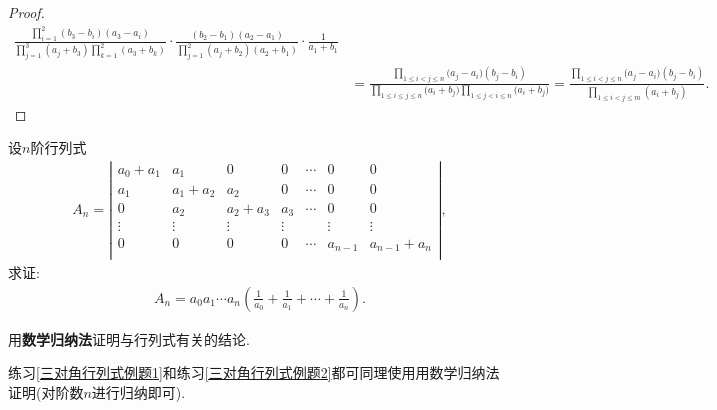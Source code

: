 \documentclass[../../main.tex]{subfiles}
\begin{document}
\begin{proof}
\begin{align*}
\frac{\prod\limits_{i=1}^2{\left( b_3-b_i \right) \left( a_3-a_i \right)}}{\prod\limits_{j=1}^3{\left( a_j+b_3 \right) \prod\limits_{k=1}^2{\left( a_3+b_k \right)}}}\cdot \frac{\left( b_2-b_1 \right) \left( a_2-a_1 \right)}{\prod\limits_{j=1}^2{\left( a_j+b_2 \right) \left( a_2+b_1 \right)}}\cdot \frac{1}{a_1+b_1}
\\
&=\frac{\prod\limits_{1\le i<j\le n}{(a_j}-a_i)(b_j-b_i)}{\prod\limits_{1\le i\le j\le n}{(a_i}+b_j)\prod\limits_{1\le j<i\le n}{(a_i}+b_j)}=\frac{\prod\limits_{1\le i<j\le n}{(a_j}-a_i)(b_j-b_i)}{\prod\limits_{1\leqslant i<j\leqslant m}{\left( a_i+b_j \right)}}.
\nonumber
\end{align*}
\end{proof}

\begin{example}\label{使用数学归纳法计算行列式例题1}
    设$n$阶行列式
    \begin{align}
    A_n=\left| \begin{matrix}
    a_0+a_1&		a_1&		0&		0&		\cdots&		0&		0\\
    a_1&		a_1+a_2&		a_2&		0&		\cdots&		0&		0\\
    0&		a_2&		a_2+a_3&		a_3&		\cdots&		0&		0\\
    \vdots&		\vdots&		\vdots&		\vdots&		&		\vdots&		\vdots\\
    0&		0&		0&		0&		\cdots&		a_{n-1}&		a_{n-1}+a_n\\
    \end{matrix} \right|,
    \nonumber
    \end{align}
    求证:
    \begin{align}
    A_n=a_0a_1\cdots a_n\left( \frac{1}{a_0}+\frac{1}{a_1}+\cdots +\frac{1}{a_n} \right) .
    \nonumber
    \end{align}
    \end{example}
    \begin{note}
    用\hypertarget{用数学归纳法与行列式有关的结论}{\textbf{数学归纳法}}证明与行列式有关的结论.
    
    练习\ref{三对角行列式例题1}和练习\ref{三对角行列式例题2}都可同理使用用数学归纳法证明(对阶数$n$进行归纳即可).
    \end{note}
\end{document}
